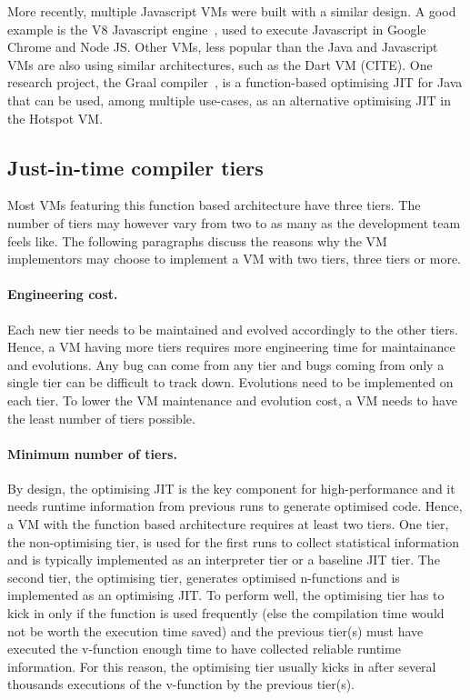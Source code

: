 \documentclass[a4paper,12pt,twoside]{../includes/ThesisStyle}
\begin{document}
More recently, multiple Javascript VMs were built with a similar design. A good example is the V8 Javascript engine~\cite{V8}, used to execute Javascript in Google Chrome and Node JS. Other VMs, less popular than the Java and Javascript VMs are also using similar architectures, such as the Dart VM (CITE). One research project, the Graal compiler~\cite{Oracle13,Dubo13c}, is a function-based optimising JIT for Java that can be used, among multiple use-cases, as an alternative optimising JIT in the Hotspot VM.

\subsection{Just-in-time compiler tiers}

Most VMs featuring this function based architecture have three tiers. The number of tiers may however vary from two to as many as the development team feels like. The following paragraphs discuss the reasons why the VM implementors may choose to implement a VM with two tiers, three tiers or more.

\paragraph{Engineering cost.} Each new tier needs to be maintained and evolved accordingly to the other tiers. Hence, a VM having more tiers requires more engineering time for maintainance and evolutions. Any bug can come from any tier and bugs coming from only a single tier can be difficult to track down. Evolutions need to be implemented on each tier. To lower the VM maintenance and evolution cost, a VM needs to have the least number of tiers possible.

\paragraph{Minimum number of tiers.} By design, the optimising JIT is the key component for high-performance and it needs runtime information from previous runs to generate optimised code. Hence, a VM with the function based architecture requires at least two tiers. One tier, the non-optimising tier, is used for the first runs to collect statistical information and is typically implemented as an interpreter tier or a baseline JIT tier. The second tier, the optimising tier, generates optimised n-functions and is implemented as an optimising JIT. To perform well, the optimising tier has to kick in only if the function is used frequently (else the compilation time would not be worth the execution time saved) and the previous tier(s) must have executed the v-function enough time to have collected reliable runtime information. For this reason, the optimising tier usually kicks in after several thousands executions of the v-function by the previous tier(s).
\end{document}
